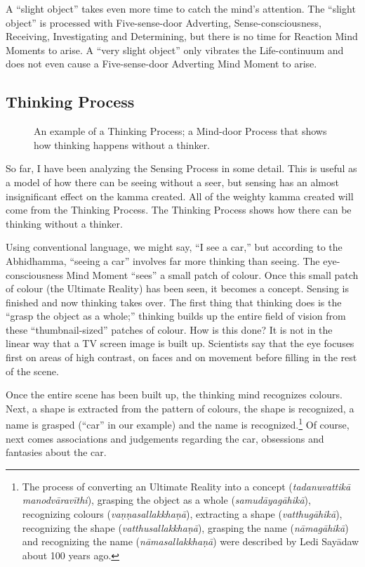 A “slight object” takes even more time to catch the mind’s attention. The “slight object” is processed with Five-sense-door Adverting, Sense-consciousness, Receiving, Investigating and Determining, but there is no time for Reaction Mind Moments to arise. A “very slight object” only vibrates the Life-continuum and does not even cause a Five-sense-door Adverting Mind Moment to arise.

\subsection*{Thinking Process}

\begin{figure}[h]
\centering

\caption{An example of a Thinking Process; a Mind-door Process that shows how thinking happens without a thinker.}
\label{fig:Process2}
\end{figure}

So far, I have been analyzing the Sensing Process in some detail. This is useful as a model of how there can be seeing without a seer, but sensing has an almost insignificant effect on the kamma created. All of the weighty kamma created will come from the Thinking Process. The Thinking Process shows how there can be thinking without a thinker.

Using conventional language, we might say, “I see a car,” but according to the Abhidhamma, “seeing a car” involves far more thinking than seeing. The eye-consciousness Mind Moment “sees” a small patch of colour. Once this small patch of colour (the Ultimate Reality) has been seen, it becomes a concept. Sensing is finished and now thinking takes over. The first thing that thinking does is the “grasp the object as a whole;” thinking builds up the entire field of vision from these “thumbnail-sized” patches of colour. How is this done? It is not in the linear way that a TV screen image is built up. Scientists say that the eye focuses first on areas of high contrast, on faces and on movement before filling in the rest of the scene.

\pagebreak

Once the entire scene has been built up, the thinking mind recognizes colours. Next, a shape is extracted from the pattern of colours, the shape is recognized, a name is grasped (“car” in our example) and the name is recognized.\footnote{The process of converting an Ultimate Reality into a concept (\textit{tadanuvattikā manodvāravīthi}), grasping the object as a whole (\textit{samudāyagāhikā}), recognizing colours (\textit{vaṇṇasallakkhaṇā}), extracting a shape (\textit{vatthugāhikā}), recognizing the shape (\textit{vatthusallakkhaṇā}), grasping the name (\textit{nāmagāhikā}) and recognizing the name (\textit{nāmasallakkhaṇā}) were described by Ledi Sayādaw about 100 years ago.} Of course, next comes associations and judgements regarding the car, obsessions and fantasies about the car.

